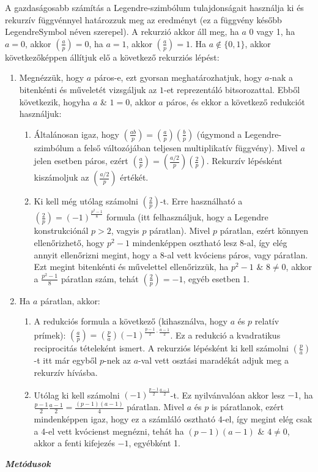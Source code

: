 \documentclass[12pt]{article}
\begin{document}
A gazdaságosabb számítás a Legendre-szimbólum tulajdonságait használja ki és rekurzív függvénnyel határozzuk meg az eredményt (ez a függvény később LegendreSymbol néven szerepel). A rekurzió akkor áll meg, ha $a$ 0 vagy 1, ha $a = 0$, akkor $\left({\frac{a}{p}}\right) = 0$, ha $a=1$, akkor $\left({\frac{a}{p}}\right) = 1$. Ha $a \not\in \{0,1\}$, akkor következőképpen állítjuk elő a következő rekurziós lépést:

\begin{enumerate}
	\item Megnézzük, hogy $a$ páros-e, ezt gyorsan meghatározhatjuk, hogy $a$-nak a bitenkénti és műveletét vizsgáljuk az $1$-et reprezentáló bitsorozattal. Ebből következik, hogyha $a$ \& $1 = 0$, akkor $a$ páros, és ekkor a következő redukciót használjuk:
	\begin{enumerate}
		\item  Általánosan igaz, hogy $\left({\frac{ab}{p}}\right) = \left({\frac{a}{p}}\right)\left({\frac{b}{p}}\right)$ (úgymond a Legendre-szimbólum a felső változójában teljesen multiplikatív függvény). Mivel $a$ jelen esetben páros, ezért $\left({\frac{a}{p}}\right) = \left({\frac{a/2}{p}}\right)\left({\frac{2}{p}}\right)$. Rekurzív lépésként kiszámoljuk az $\left({\frac{a/2}{p}}\right)$ értékét.
		\item Ki kell még utólag számolni $\left({\frac{2}{p}}\right)$-t. Erre használható a $\left({\frac{2}{p}}\right) = (-1)^{\frac{p^2-1}{8}}$ formula (itt felhasználjuk, hogy a Legendre konstrukciónál $p > 2$, vagyis $p$ páratlan). Mivel $p$ páratlan, ezért könnyen ellenőrizhető, hogy $p^2-1$ mindenképpen osztható lesz 8-al, így elég annyit ellenőrizni megint, hogy a 8-al vett kvóciens páros, vagy páratlan. Ezt megint bitenkénti és művelettel ellenőrizzük, ha $p^2-1$ \& $8 \not= 0$, akkor a $\frac{p^2-1}{8}$ páratlan szám, tehát $\left({\frac{2}{p}}\right) = -1$, egyéb esetben 1.
	\end{enumerate}
	\item Ha $a$ páratlan, akkor:
	\begin{enumerate}
		\item A redukciós formula a következő (kihasználva, hogy $a$ és $p$ relatív prímek): $\left({\frac{a}{p}}\right) = \left({\frac{p}{a}}\right) (-1)^{\frac{p-1}{2}\cdot\frac{a-1}{2}}$. Ez a redukció a kvadratikus reciprocitás tételeként ismert. A rekurziós lépésként ki kell számolni $\left({\frac{p}{a}}\right)$-t itt már egyből $p$-nek az $a$-val vett osztási maradékát adjuk meg a rekurzív hívásba.
		\item Utólag ki kell számolni $(-1)^{\frac{p-1}{2}\frac{a-1}{2}}$-t. Ez nyilvánvalóan akkor lesz $-1$, ha $\frac{p-1}{2}\frac{a-1}{2} = \frac{(p-1)(a-1)}{4}$ páratlan. Mivel $a$ és $p$ is páratlanok, ezért mindenképpen igaz, hogy ez a számláló osztható 4-el, így megint elég csak a 4-el vett kvócienst megnézni, tehát ha $(p-1)(a-1)$ \& $4 \not=0$, akkor a fenti kifejezés $-1$, egyébként 1.
	\end{enumerate}
\end{enumerate}
\textbf{\textit{Metódusok}}
\end{document}
